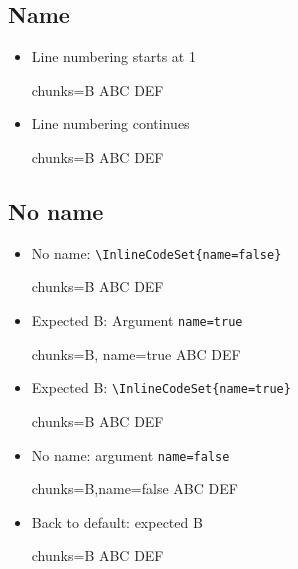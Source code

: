 \documentclass{article}
\begin{document}
\subsection{Name}
\begin{itemize}
\item Line numbering starts at 1
\begin{InlineCode}{chunks=B}
ABC
DEF
\end{InlineCode}
\item Line numbering continues
\begin{InlineCode}{chunks=B}
ABC
DEF
\end{InlineCode}
\end{itemize}
\subsection{No name}
\begin{itemize}
\item
{}
No name: \verb|\InlineCodeSet{name=false}|
\begin{InlineCode}{chunks=B}
ABC
DEF
\end{InlineCode}
\item
Expected B: Argument \verb|name=true|
\begin{InlineCode}{chunks=B, name=true}
ABC
DEF
\end{InlineCode}
\item
Expected B: \verb|\InlineCodeSet{name=true}|
\begin{InlineCode}{chunks=B}
ABC
DEF
\end{InlineCode}
\item
No name: argument \verb|name=false|
\begin{InlineCode}{chunks=B,name=false}
ABC
DEF
\end{InlineCode}
\item
Back to default: expected B
\begin{InlineCode}{chunks=B}
ABC
DEF
\end{InlineCode}
\end{itemize}
\end{document}
